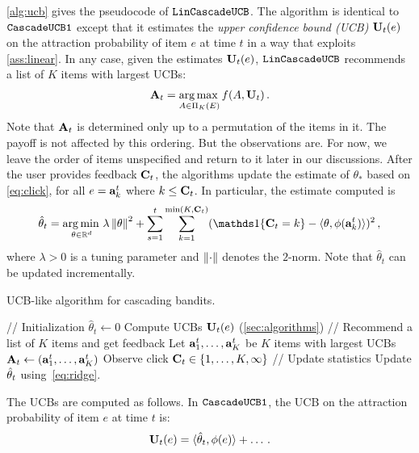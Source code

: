 \cref{alg:ucb} gives the pseudocode of ${\tt LinCascadeUCB}$. 
The algorithm is identical to ${\tt CascadeUCB1}$ except that it estimates the 
\emph{upper confidence bound (UCB)} $\mathbf{U}_t(e)$ on the attraction probability of item $e$ at time $t$
in a way that exploits \cref{ass:linear}. In any case, given the estimates $\mathbf{U}_t(e)$,
${\tt LinCascadeUCB}$ recommends a list of $K$ items with largest UCBs:
\begin{align}
  \mathbf{A}_t = \operatorname*{arg\,max\,}_{A \in \Pi_K(E)} f(A, \mathbf{U}_t)\,.
\end{align}
Note that $\mathbf{A}_t$ is determined only up to a permutation of the items in it. The payoff is not affected by this ordering. But the observations are. For now, we leave the order of items unspecified and return to it later in our discussions. After the user provides feedback $\mathbf{C}_t$, the algorithms update the estimate of $\theta_*$ 
based on \eqref{eq:click}, for all $e = \mathbf{a}^t_k$ where $k \leq \mathbf{C}_t$.
In particular, the estimate computed is
\begin{align}
\label{eq:ridge}
\hat{\theta}_t = \argmin_{\theta\in \R^d}
\lambda \norm{\theta}^2 + 
 \sum_{s=1}^t \sum_{k=1}^{\min(K,\rnd{C}_t)} ( \I{\rnd{C}_t = k} - \ip{\theta,\phi(\rnd{a}^t_k)})^2 \,,
\end{align}
where $\lambda>0$ is a tuning parameter and $\left\|\cdot\right\|$ denotes the $2$-norm.
Note that $\hat{\theta}_t$ can be updated incrementally. 

\begin{algorithm}[t]
  \caption{UCB-like algorithm for cascading bandits.}
  \label{alg:ucb}
  \begin{algorithmic}
    \STATE // Initialization
    \STATE $\hat{\theta}_t \gets 0$
      \STATE Compute UCBs $\mathbf{U}_t(e)$ (\cref{sec:algorithms})
      \STATE // Recommend a list of $K$ items and get feedback
      \STATE Let $\mathbf{a}^t_1, \dots, \mathbf{a}^t_K$ be $K$ items with largest UCBs
      \STATE $\mathbf{A}_t \gets (\mathbf{a}^t_1, \dots, \mathbf{a}^t_K)$
      \STATE Observe click $\mathbf{C}_t \in \left\{1, \dots, K, \infty\right\}$
      \STATE // Update statistics
      \STATE Update $\hat{\mathbf{\theta}}_t$ using~\eqref{eq:ridge}.
    \ENDFOR
  \end{algorithmic}
\end{algorithm}

The UCBs are computed as follows. In ${\tt CascadeUCB1}$, the UCB on the attraction probability of item $e$ at time $t$ is:
\begin{align*}
  \mathbf{U}_t(e) = \langle \hat{\mathbf{\theta}}_t,\phi(e) \rangle + \dots\,.
\end{align*}

